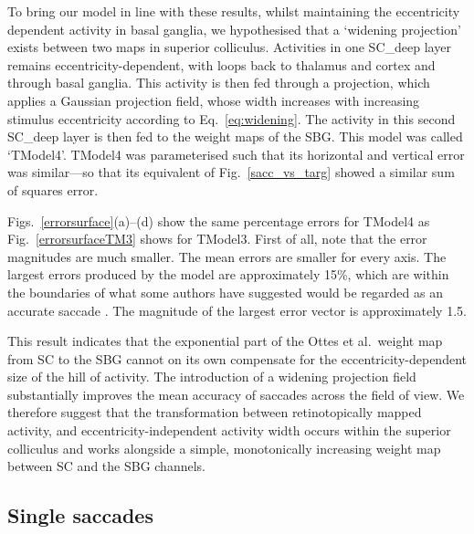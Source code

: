 \documentclass{frontiersSCNS}
\begin{document}
To bring our model in line with these results, whilst maintaining the
eccentricity dependent activity in basal ganglia, we hypothesised
that a `widening projection' exists between two maps in superior
colliculus. Activities in one SC\_deep layer remains eccentricity-dependent,
with loops back to thalamus and cortex and through basal ganglia.
This activity is then fed through a projection, which applies a
Gaussian projection field, whose width increases with increasing
stimulus eccentricity according to Eq.~\ref{eq:widening}.
The activity in this second SC\_deep layer is then fed to the
weight maps of the SBG. This model was called `TModel4'. TModel4
was parameterised such that its horizontal and vertical error
was similar---so that its equivalent of Fig.~\ref{sacc_vs_targ}
showed a similar sum of squares error.

Figs.~\ref{errorsurface}(a)--(d) show the same percentage errors
for TModel4 as Fig.~\ref{errorsurfaceTM3} shows for TModel3.
First of all, note that the error magnitudes are much smaller. The mean
errors are smaller for every axis. The largest errors produced by
the model are approximately 15\%, which are
within the boundaries of what some authors have suggested would be regarded
as an accurate saccade \citep{mcpeek_saccade_2002,mcpeek_incomplete_2006}.
The magnitude of the largest error vector is approximately 1.5\dg.

This result indicates that the
exponential part of the Ottes et al.~weight map from SC to the SBG cannot
on its own compensate for the eccentricity-dependent size of the hill of
activity. The introduction of a widening projection field substantially
improves the mean accuracy of saccades across the field of view.
We therefore suggest that the transformation between retinotopically mapped
activity, and eccentricity-independent activity width occurs
within the superior colliculus and works alongside a simple,
monotonically increasing weight map between SC and the SBG channels.

\subsection{Single saccades} \label{sec:singlesaccades}
\end{document}
